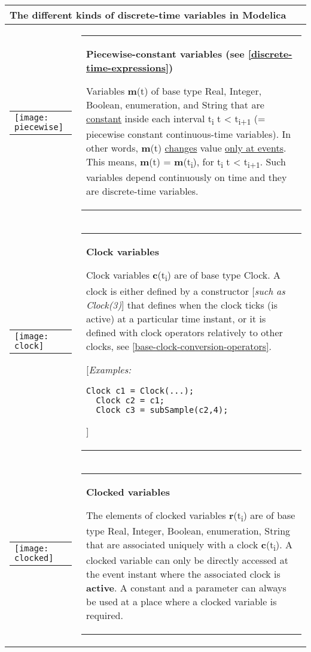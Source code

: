 \begin{longtable}[]{|p{7.3cm}|p{7.3cm}|}
\hline
\multicolumn{2}{|p{14.6cm}|}{\textbf{The different kinds of discrete-time variables in Modelica}}\\ \hline
\endhead
\begin{tabular}{p{7cm}}
\texttt{[image: piecewise]}
\end{tabular}&\begin{tabular}{p{7cm}}\textbf{Piecewise-constant variables (see \autoref{discrete-time-expressions})}

Variables \textbf{m}(t) of base type Real, Integer, Boolean,
enumeration, and String that are \underline{constant} inside each interval
t\textsubscript{i} $\le$ t \textless{} t\textsubscript{i+1} (= piecewise
constant continuous-time variables). In other words, \textbf{m}(t)
\underline{changes} value \underline{only at events}. This means, \textbf{m}(t) =
\textbf{m}(t\textsubscript{i}), for t\textsubscript{i} $\le$ t \textless{}
t\textsubscript{i+1}. Such variables depend continuously on time and
they are discrete-time variables.
\end{tabular}\\ \hline
\begin{tabular}{p{7cm}}
\texttt{[image: clock]}
\end{tabular}&
\begin{tabular}{p{7cm}}\textbf{Clock variables}

Clock variables \textbf{c}(t\textsubscript{i}) are of base type Clock. A
clock is either defined by a constructor {[}\emph{such as Clock(3)}{]}
that defines when the clock ticks (is active) at a particular time
instant, or it is defined with clock operators relatively to other
clocks, see \autoref{base-clock-conversion-operators}.

{[}\emph{Examples:}
\begin{lstlisting}[language=modelica]
  Clock c1 = Clock(...);
  Clock c2 = c1;
  Clock c3 = subSample(c2,4);
\end{lstlisting}
{]}
\end{tabular}\\ \hline
\begin{tabular}{p{7cm}}
\texttt{[image: clocked]}
\end{tabular}&
\begin{tabular}{p{7cm}}\textbf{Clocked variables}

The elements of clocked variables \textbf{r}(t\textsubscript{i}) are of
base type Real, Integer, Boolean, enumeration, String that are
associated uniquely with a clock \textbf{c}(t\textsubscript{i}). A
clocked variable can only be directly accessed at the event instant
where the associated clock is \textbf{active}. A constant and a
parameter can always be used at a place where a clocked variable is
required.


\end{tabular}
\end{longtable}
